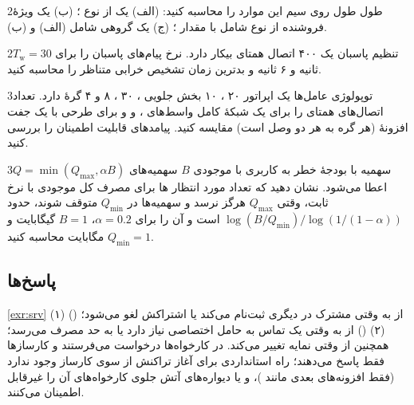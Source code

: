 \documentclass[11pt,a4paper]{article}
\begin{document}
\begin{exercisebox}{2}{طول }\label{exr:avp}
طول روی سیم این موارد را محاسبه کنید: (الف) یک  از نوع ؛ (ب) یک  ویژهٔ فروشنده از
نوع  شامل  با مقدار ؛ (ج) یک  گروهی شامل (الف) و (ب).
\end{exercisebox}

\begin{exercisebox}{2}{تنظیم پاسبان}\label{exr:watchdog}
یک  ۴۰۰ اتصال همتای بیکار دارد. نرخ پیام‌های پاسبان را برای $T_\mathrm{w} = 30$ ثانیه و ۶ ثانیه و بدترین زمان
تشخیص خرابی متناظر را محاسبه کنید.
\end{exercisebox}

\begin{exercisebox}{3}{توپولوژی عامل‌ها}\label{exr:topo}
یک اپراتور ۲۰ ، ۱۰ بخش جلویی ، ۳۰ ، ۸  و ۴ گرهٔ  دارد. تعداد اتصال‌های
همتای  را برای یک شبکهٔ کامل واسط‌های ،  و  و برای طرحی با یک جفت افزونهٔ 
(هر گره به هر دو  وصل است) مقایسه کنید. پیامدهای قابلیت اطمینان را بررسی کنید.
\end{exercisebox}

\begin{exercisebox}{3}{سهمیه با بودجهٔ خطر}\label{exr:risk}
به کاربری با موجودی $B$ سهمیه‌های $Q = \min(Q_{\max}, \alpha B)$ اعطا می‌شود. نشان دهید که تعداد مورد انتظار
ها برای مصرف کل موجودی با نرخ ثابت، وقتی $Q_{\max}$ هرگز نرسد و سهمیه‌ها در $Q_{\min}$ متوقف شوند، حدود
$\log(B/Q_{\min})/\log(1/(1-\alpha))$ است و آن را برای $\alpha = 0.2$، $B = 1$ گیگابایت و $Q_{\min} = 1$ مگابایت
محاسبه کنید.
\end{exercisebox}

\subsection*{پاسخ‌ها}

\begin{solutionbox}{\ref{exr:srv}}
(۱)  () از  به  وقتی مشترک در  دیگری ثبت‌نام می‌کند یا
اشتراکش لغو می‌شود؛ (۲)  () از  به  وقتی یک تماس  به حامل
اختصاصی نیاز دارد یا به حد مصرف می‌رسد؛ همچنین  از  وقتی نمایه تغییر می‌کند. در
 کارخواه‌ها درخواست می‌فرستند و کارسازها فقط پاسخ می‌دهند؛ راه استانداردی برای آغاز تراکنش از سوی کارساز
وجود ندارد (فقط افزونه‌های بعدی مانند )، و  یا دیواره‌های آتش جلوی کارخواه‌های
 آن را غیرقابل اطمینان می‌کنند.
\end{solutionbox}
\end{document}
